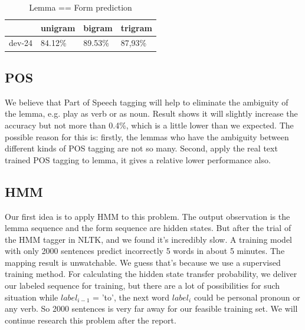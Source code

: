 \documentclass[a4paper]{article}
\begin{document}
\begin{table}[htp]
\centering
\begin{tabular}{|l|l|l|l|}
\hline
       & unigram & bigram & trigram \\ \hline
dev-24 & 84.12\%   & 89.53\%  & 87,93\%   \\ \hline
\end{tabular}
\caption{Lemma == Form prediction}
\label{tb:lemma_eq_tb}
\end{table}

\subsection*{POS}
We believe that Part of Speech tagging will help to eliminate the ambiguity of the lemma, e.g. play as verb or as noun. Result shows it will slightly increase the accuracy but not more than 0.4\%, which is a little lower than we expected. The possible reason for this is: firstly, the lemmas who have the ambiguity between different kinds of POS tagging are not so many. Second, apply the real text trained POS tagging to lemma, it gives a relative lower performance also.

\subsection*{HMM}
Our first idea is to apply HMM to this problem. The output observation is the lemma sequence and the form sequence are hidden states. But after the trial of the HMM tagger in NLTK, and we found it's incredibly slow. A training model with only 2000 sentences predict incorrectly 5 words in about 5 minutes.  The mapping result is unwatchable. We guess that's because we use a supervised training method. For calculating the hidden state transfer probability, we deliver our labeled sequence for training, but there are a lot of possibilities for such situation while $label_{i-1}$ = 'to', the next word $label_i$ could be personal pronoun or any verb. So 2000 sentences is very far away for our feasible training set. We will continue research this problem after the report.
\end{document}

